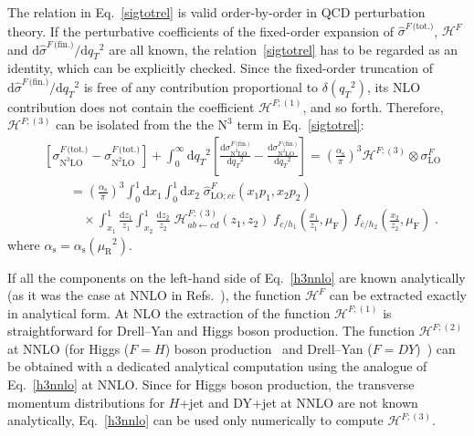\documentclass[12pt]{article}
\DeclareRobustCommand{\nn}{\nonumber}
\DeclareRobustCommand{\alphas}{\ensuremath{\alpha_{\mathrm{s}}}\xspace}
\DeclareRobustCommand{\as}{\alphas}
\DeclareRobustCommand{\asOpi}{\ensuremath{\left(\frac{\as}{\pi}\right)}} %
\DeclareRobustCommand{\mur}{\ensuremath{\mu_{\mathrm{R}}}\xspace}
\DeclareRobustCommand{\muR}{\mur}
\DeclareRobustCommand{\muf}{\ensuremath{\mu_{\mathrm{F}}}\xspace}
\DeclareRobustCommand{\qt}{\ensuremath{q_T}\xspace}
\DeclareRobustCommand{\rd}{\ensuremath{\mathrm{d}}}
\DeclareRobustCommand{\cH}{\ensuremath{\mathcal{H}}}
\DeclareRobustCommand{\fin}{\text{(fin.)}\xspace}
\DeclareRobustCommand{\tot}{\text{(tot.)}\xspace}
\DeclareRobustCommand{\LO}{\text{LO}\xspace}
\DeclareRobustCommand{\N}[1]{\ensuremath{\text{N}^{#1}}} %
\begin{document}
The relation in Eq.~\eqref{sigtotrel} is valid order-by-order in QCD perturbation theory. If the perturbative coefficients of the fixed-order expansion of $\hat{\sigma}^{F\,\tot}$, $\cH^F$ and $\rd\hat{\sigma}^{F\,\fin}/\rd \qt^2$ are all known, the relation~\eqref{sigtotrel} has to be regarded as an identity, which can be explicitly checked. Since the fixed-order truncation of $\rd\hat{\sigma}^{F\,\fin}/\rd \qt^2$ is free of any contribution proportional to $\delta(\qt^2)$, its NLO contribution  does not contain the coefficient $\cH^{F;(1)}$, and so forth. 
Therefore, $\cH^{F;(3)}$ can be isolated from the  the  \N3\LO  term in Eq.~\eqref{sigtotrel}:
\begin{align}
  &
  \left[
    \sigma^{F\,\tot}_{\N3\LO} - 
    \sigma^{F\,\tot}_{\N2\LO}
  \right] +
  \int_0^\infty\rd\qt^2 \left[
    \frac{\rd\sigma^{F\,\fin}_{\N3\LO}}{\rd\qt^2} -
    \frac{\rd\sigma^{F\,\fin}_{\N2\LO}}{\rd\qt^2}
  \right]
  =
  \asOpi^3 \cH^{F;(3)} \otimes \sigma^F_{\LO}
  \nn\\&\qquad=
  \asOpi^3 \int_0^1\rd x_1 \int_0^1\rd x_2 \;
  \hat{\sigma}^{F}_{\LO;c\bar{c}}(x_1 p_1, x_2 p_2)
  \nn\\&\qquad\quad\times
  \int_{x_1}^1 \frac{\rd z_1}{z_1} \int_{x_2}^1 \frac{\rd z_2}{z_2} \;
  \cH^{F;(3)}_{ab \gets cd}(z_1, z_2) \;
  f_{c/h_1}\left(\frac{x_1}{z_1},\muf\right) \; f_{\bar{c}/h_2}\left(\frac{x_2}{z_2},\muf\right) \;.
  \label{h3nnlo}
\end{align}
where $\as=\as(\muR^2)$.

If all the components on the left-hand side of Eq.~\eqref{h3nnlo} are known analytically (as it was the case at NNLO in Refs.~\cite{Catani:2011kr,Catani:2012qa}), the function $\cH^{F}$ can be extracted exactly in analytical form. At NLO the extraction of the function  $\cH^{F;(1)}$ is straightforward for Drell--Yan and Higgs boson production. The function $\cH^{F;(2)}$ at NNLO (for Higgs ($F=H$) boson production~\cite{Catani:2011kr} and Drell--Yan ($F=DY$)~\cite{Catani:2012qa}) can be obtained with a dedicated analytical computation using the analogue of Eq.~\eqref{h3nnlo} at NNLO. Since for Higgs boson production, the transverse momentum distributions for $H$+jet and DY+jet at NNLO are not known analytically, Eq.~\eqref{h3nnlo} can be used only numerically to compute $\cH^{F;(3)}$. 
\end{document}
